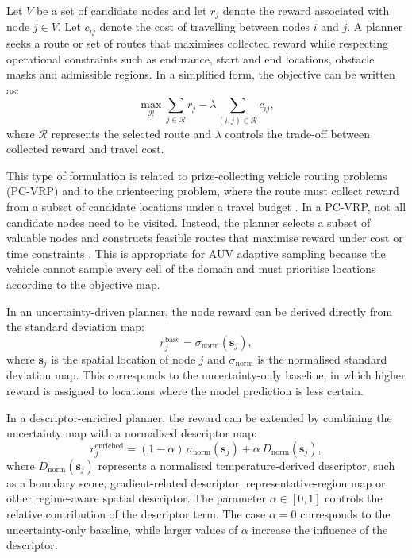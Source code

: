 Let $V$ be a set of candidate nodes and let $r_j$ denote the reward associated with node $j \in V$. Let $c_{ij}$ denote the cost of travelling between nodes $i$ and $j$. A planner seeks a route or set of routes that maximises collected reward while respecting operational constraints such as endurance, start and end locations, obstacle masks and admissible regions. In a simplified form, the objective can be written as:
\begin{equation}
    \max_{\mathcal{R}} \sum_{j \in \mathcal{R}} r_j - \lambda \sum_{(i,j) \in \mathcal{R}} c_{ij},
\end{equation}
where $\mathcal{R}$ represents the selected route and $\lambda$ controls the trade-off between collected reward and travel cost.

This type of formulation is related to prize-collecting vehicle routing problems (PC-VRP) and to the orienteering problem, where the route must collect reward from a subset of candidate locations under a travel budget \cite{vansteenwegen2011orienteering,gunawan2016orienteering}. In a PC-VRP, not all candidate nodes need to be visited. Instead, the planner selects a subset of valuable nodes and constructs feasible routes that maximise reward under cost or time constraints \cite{bernacchi2025closingloop,toth2014vehicle,vidal2013hybrid}. This is appropriate for AUV adaptive sampling because the vehicle cannot sample every cell of the domain and must prioritise locations according to the objective map.

In an uncertainty-driven planner, the node reward can be derived directly from the standard deviation map:
\begin{equation}
r_j^{\mathrm{base}} = \sigma_{\mathrm{norm}}(\mathbf{s}_j),
\end{equation}
where $\mathbf{s}_j$ is the spatial location of node $j$ and $\sigma_{\mathrm{norm}}$ is the normalised standard deviation map. This corresponds to the uncertainty-only baseline, in which higher reward is assigned to locations where the model prediction is less certain.

In a descriptor-enriched planner, the reward can be extended by combining the uncertainty map with a normalised descriptor map:
\begin{equation}
r_j^{\mathrm{enriched}} =
(1-\alpha)\,\sigma_{\mathrm{norm}}(\mathbf{s}_j)
+
\alpha\,D_{\mathrm{norm}}(\mathbf{s}_j),
\end{equation}
where $D_{\mathrm{norm}}(\mathbf{s}_j)$ represents a normalised temperature-derived descriptor, such as a boundary score, gradient-related descriptor, representative-region map or other regime-aware spatial descriptor. The parameter $\alpha \in [0,1]$ controls the relative contribution of the descriptor term. The case $\alpha=0$ corresponds to the uncertainty-only baseline, while larger values of $\alpha$ increase the influence of the descriptor.

